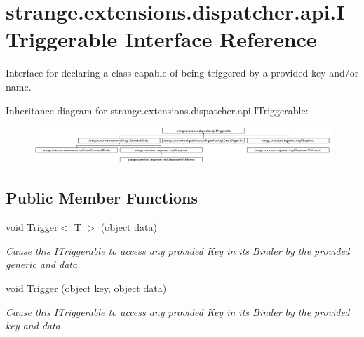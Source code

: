 \hypertarget{interfacestrange_1_1extensions_1_1dispatcher_1_1api_1_1_i_triggerable}{\section{strange.\-extensions.\-dispatcher.\-api.\-I\-Triggerable Interface Reference}
\label{interfacestrange_1_1extensions_1_1dispatcher_1_1api_1_1_i_triggerable}
}


Interface for declaring a class capable of being triggered by a provided key and/or name.  


Inheritance diagram for strange.\-extensions.\-dispatcher.\-api.\-I\-Triggerable\-:\begin{figure}[H]
\begin{center}
\leavevmode
\includegraphics[height=1.382716cm]{interfacestrange_1_1extensions_1_1dispatcher_1_1api_1_1_i_triggerable}
\end{center}
\end{figure}
\subsection*{Public Member Functions}
\begin{DoxyCompactItemize}
\item 
\hypertarget{interfacestrange_1_1extensions_1_1dispatcher_1_1api_1_1_i_triggerable_af2d6a85b1e00a06bab56f21add189549}{void \hyperlink{interfacestrange_1_1extensions_1_1dispatcher_1_1api_1_1_i_triggerable_af2d6a85b1e00a06bab56f21add189549}{Trigger$<$ T $>$} (object data)}\label{interfacestrange_1_1extensions_1_1dispatcher_1_1api_1_1_i_triggerable_af2d6a85b1e00a06bab56f21add189549}

\begin{DoxyCompactList}\small\item\em Cause this \hyperlink{interfacestrange_1_1extensions_1_1dispatcher_1_1api_1_1_i_triggerable}{I\-Triggerable} to access any provided Key in its Binder by the provided generic and data. \end{DoxyCompactList}\item 
\hypertarget{interfacestrange_1_1extensions_1_1dispatcher_1_1api_1_1_i_triggerable_a361da017a6fcf4462bf05089cbfa6304}{void \hyperlink{interfacestrange_1_1extensions_1_1dispatcher_1_1api_1_1_i_triggerable_a361da017a6fcf4462bf05089cbfa6304}{Trigger} (object key, object data)}\label{interfacestrange_1_1extensions_1_1dispatcher_1_1api_1_1_i_triggerable_a361da017a6fcf4462bf05089cbfa6304}

\begin{DoxyCompactList}\small\item\em Cause this \hyperlink{interfacestrange_1_1extensions_1_1dispatcher_1_1api_1_1_i_triggerable}{I\-Triggerable} to access any provided Key in its Binder by the provided key and data. \end{DoxyCompactList}\end{DoxyCompactItemize}


